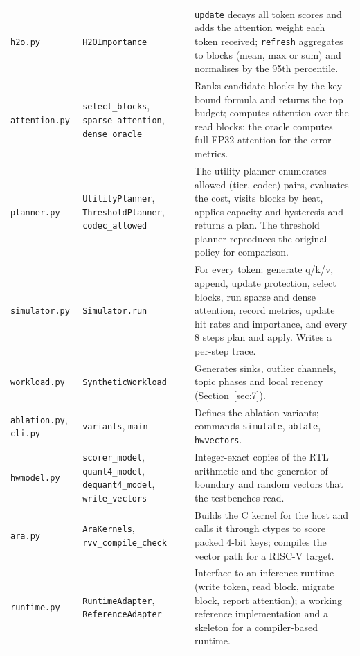 \documentclass[12pt,a4paper]{report}
\begin{document}
{\begin{longtable}{>{\raggedright\arraybackslash}p{1.08in}>{\raggedright\arraybackslash}p{1.54in}>{\raggedright\arraybackslash}p{3.34in}}
\texttt{h2o.\allowbreak{}py} & \texttt{H2OImportance} & \texttt{update} decays all token scores and adds the attention weight each token received; \texttt{refresh} aggregates to blocks (mean, max or sum) and normalises by the 95th percentile. \\
\texttt{attention.\allowbreak{}py} & \texttt{select\_\allowbreak{}\allowbreak{}blocks}, \texttt{sparse\_\allowbreak{}\allowbreak{}attention}, \texttt{dense\_\allowbreak{}\allowbreak{}oracle} & Ranks candidate blocks by the key-bound formula and returns the top budget; computes attention over the read blocks; the oracle computes full FP32 attention for the error metrics. \\
\texttt{planner.\allowbreak{}py} & \texttt{UtilityPlanner}, \texttt{ThresholdPlanner}, \texttt{codec\_\allowbreak{}\allowbreak{}allowed} & The utility planner enumerates allowed (tier, codec) pairs, evaluates the cost, visits blocks by heat, applies capacity and hysteresis and returns a plan. The threshold planner reproduces the original policy for comparison. \\
\texttt{simulator.\allowbreak{}py} & \texttt{Simulator.\allowbreak{}run} & For every token: generate q/k/v, append, update protection, select blocks, run sparse and dense attention, record metrics, update hit rates and importance, and every 8 steps plan and apply. Writes a per-step trace. \\
\texttt{workload.\allowbreak{}py} & \texttt{SyntheticWorkload} & Generates sinks, outlier channels, topic phases and local recency (Section~\ref{sec:7}). \\
\texttt{ablation.\allowbreak{}py}, \texttt{cli.\allowbreak{}py} & \texttt{variants}, \texttt{main} & Defines the ablation variants; commands \texttt{simulate}, \texttt{ablate}, \texttt{hwvectors}. \\
\texttt{hwmodel.\allowbreak{}py} & \texttt{scorer\_\allowbreak{}\allowbreak{}model}, \texttt{quant4\_\allowbreak{}\allowbreak{}model}, \texttt{dequant4\_\allowbreak{}\allowbreak{}model}, \texttt{write\_\allowbreak{}\allowbreak{}vectors} & Integer-exact copies of the RTL arithmetic and the generator of boundary and random vectors that the testbenches read. \\
\texttt{ara.\allowbreak{}py} & \texttt{AraKernels}, \texttt{rvv\_\allowbreak{}\allowbreak{}compile\_\allowbreak{}\allowbreak{}check} & Builds the C kernel for the host and calls it through ctypes to score packed 4-bit keys; compiles the vector path for a RISC-V target. \\
\texttt{runtime.\allowbreak{}py} & \texttt{RuntimeAdapter}, \texttt{ReferenceAdapter} & Interface to an inference runtime (write token, read block, migrate block, report attention); a working reference implementation and a skeleton for a compiler-based runtime. \\
\bottomrule
\end{longtable}}
\end{document}
